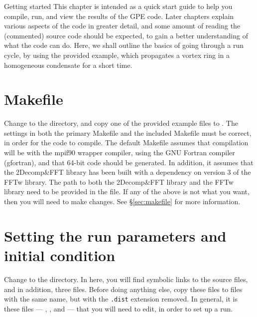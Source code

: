 %
%
%

\begin{chapter}{\label{cha:quickstart}Getting started}
  This chapter is intended as a quick start guide to help you compile, run, and
  view the results of the GPE code.  Later chapters explain various aspects of
  the code in greater detail, and some amount of reading the (commented) source
  code should be expected, to gain a better understanding of what the code can
  do.  Here, we shall outline the basics of going through a run cycle, by using
  the provided  example, which propagates a vortex ring in a
  homogeneous condensate for a short time.

  \section{Makefile}
  Change to the  directory, and copy one of the provided example
   files to .  The settings in
  both the primary Makefile and the included Makefile must be correct, in order
  for the code to compile.  The default Makefile assumes that compilation will
  be with the mpif90 wrapper compiler, using the GNU Fortran compiler
  (gfortran), and that 64-bit code should be generated.  In addition, it
  assumes that the 2Decomp\&FFT library has been built with a dependency on
  version 3 of the FFTw library.  The path to both the 2Decomp\&FFT library and
  the FFTw library need to be provided in the  file.  If
  any of the above is not what you want, then you will need to make changes.
  See \S\ref{sec:makefile} for more information.

  \section{Setting the run parameters and initial condition}
  Change to the  directory.  In here, you will find
  symbolic links to the source files, and in addition, three 
  files.  Before doing anything else, copy these files to files with the same
  name, but with the \verb".dist" extension removed.  In general, it is these
  files --- , , and  ---
  that you will need to edit, in order to set up a run.


\end{chapter}
